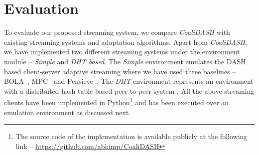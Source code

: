 \section{Evaluation}
To evaluate our proposed streaming system, we compare \textit{CoaliDASH} with existing streaming systems and adaptation algorithms. Apart from \textit{CoaliDASH}, we have implemented two different streaming systems under the environment module --  {\it Simple} and {\it DHT based}. The {\it Simple} environment emulates the DASH based client-server adaptive streaming where we have used three baselines -- BOLA~\cite{bola2-acm-mmsys2018}, MPC~\cite{MPC-SIGCOMM-2015} and Pensieve~\cite{Pensieve}.  The {\it DHT} environment represents an environment with a distributed hash table based peer-to-peer system \cite{ChordStoica,dht1}.
All the above streaming clients have been implemented in Python\footnote{The source code of the implementation is available publicly at the following link -- \url{https://github.com/abhimp/CoaliDASH}} and has been executed over an emulation environment as discussed next. 

